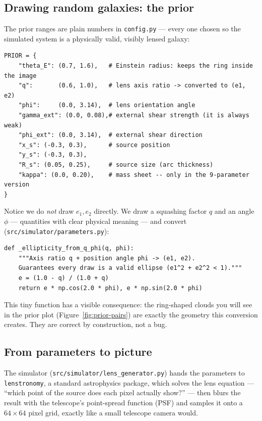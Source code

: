 \documentclass[11pt,a4paper]{article}
\begin{document}
\subsection{Drawing random galaxies: the prior}

The prior ranges are plain numbers in \texttt{config.py} --- every one chosen so
the simulated system is a physically valid, visibly lensed galaxy:

\begin{lstlisting}
PRIOR = {
    "theta_E": (0.7, 1.6),   # Einstein radius: keeps the ring inside the image
    "q":       (0.6, 1.0),   # lens axis ratio -> converted to (e1, e2)
    "phi":     (0.0, 3.14),  # lens orientation angle
    "gamma_ext": (0.0, 0.08),# external shear strength (it is always weak)
    "phi_ext": (0.0, 3.14),  # external shear direction
    "x_s": (-0.3, 0.3),      # source position
    "y_s": (-0.3, 0.3),
    "R_s": (0.05, 0.25),     # source size (arc thickness)
    "kappa": (0.0, 0.20),    # mass sheet -- only in the 9-parameter version
}
\end{lstlisting}

Notice we do \emph{not} draw $e_1, e_2$ directly. We draw a squashing factor $q$
and an angle $\phi$ --- quantities with clear physical meaning --- and convert
(\texttt{src/simulator/parameters.py}):

\begin{lstlisting}
def _ellipticity_from_q_phi(q, phi):
    """Axis ratio q + position angle phi -> (e1, e2).
    Guarantees every draw is a valid ellipse (e1^2 + e2^2 < 1)."""
    e = (1.0 - q) / (1.0 + q)
    return e * np.cos(2.0 * phi), e * np.sin(2.0 * phi)
\end{lstlisting}

This tiny function has a visible consequence: the ring-shaped clouds you will see
in the prior plot (Figure~\ref{fig:prior-pairs}) are exactly the geometry this
conversion creates. They are correct by construction, not a bug.

\subsection{From parameters to picture}

The simulator (\texttt{src/simulator/lens\_generator.py}) hands the parameters to
\texttt{lenstronomy}, a standard astrophysics package, which solves the lens
equation --- ``which point of the source does each pixel actually show?'' --- then
blurs the result with the telescope's point-spread function (PSF) and samples it
onto a $64\times64$ pixel grid, exactly like a small telescope camera would.
\end{document}
